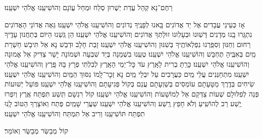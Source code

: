 \documentclass[twoside, openany, parskip=half, 11pt]{book}
\begin{document}
\shatzvkahal
רַחֶם־נָא קְהַל עֲדַת יְשֻׁרוּן סְלַח וּמְחַל עֲוֹנָם וְהוֹשִׁיעֵֽנוּ אֱלֹהֵי יִשְׁעֵֽנוּ׃

\begin{small}
אָז כְּעֵינֵי עֲבָדִים אֶל יַד אֲדוֹנִים בָּֽאנוּ לְפָנֶֽיךָ נְדוֹנִים וְהוֹשִׁיעֵֽנוּ אֱלֹהֵי יִשְׁעֵֽנוּ׃
גֵּאֶה אֲדוֹנֵי הָאֲדוֹנִים נִתְגָּֽרוּ בָֽנוּ מְדָנִים דָּשֽׁוּנוּ וּבְעָלֽוּנוּ זוּלָתְךָ אֲדוֹנִים וְהוֹשִׁיעֵֽנוּ אֱלֹהֵי יִשְׁעֵֽנוּ׃
הֵן גַּֽשְׁנוּ הַיּוֹם בְּתַחֲנוּן עָדֶֽיךָ רַחוּם וְחַנּוּן וְסִפַּֽרְנוּ נִפְלְאוֹתֶֽיךָ בְּשִׁנּוּן וְהוֹשִׁיעֵֽנוּ אֱלֹהֵי יִשְׁעֵֽנוּ׃
זָבַת חָלָב וּדְבַשׁ נָא אַל תִּיבָשׁ חַשְׁרַת מַֽיִם בְּאִבֶּֽיהָ תֶּחְבָּשׁ וְהוֹשִׁיעֵֽנוּ אֱלֹהֵי יִשְׁעֵֽנוּ׃
טְעֵֽנוּ בִשְׁמֵנָה בְּיַד שִׁבְעָה וּשְׁמוֹנָה יָשָׁר צַדִּיק אֵל אֱמוּנָה וְהוֹשִׁיעֵֽנוּ אֱלֹהֵי יִשְׁעֵֽנוּ׃
כָּרַֽתָּ בְרִית לָאָֽרֶץ עֹד כׇּל־יְמֵי הָאָֽרֶץ לְבִלְתִּי פְרָץ בָּהּ פָּֽרֶץ וְהוֹשִׁיעֵֽנוּ אֱלֹהֵי יִשְׁעֵֽנוּ׃
מִתְחַנְּנִים עֲלֵי מַֽיִם כַּעֲרָבִים עַל יִבְלֵי מַֽיִם נָא זְכׇר־לָֽמוֹ נִסּוּךְ הַמַּֽיִם וְהוֹשִׁיעֵֽנוּ אֱלֹהֵי יִשְׁעֵֽנוּ׃
שִׂיחִים בְּדֶֽרֶךְ מַטָּעָתָם עוֹמְסִים בְּשַׁוְעָתָם עֲנֵם בְּקוֹל פְּגִיעָתָם וְהוֹשִׁיעֵֽנוּ אֱלֹהֵי יִשְׁעֵֽנוּ׃
פּוֹעֵל יְשׁוּעוֹת פְּנֵה לְפִלּוּלָם שְׁעוֹת צַדְּקֵם אֵל לְמוֹשָׁעוֹת וְהוֹשִׁיעֵֽנוּ אֱלֹהֵי יִשְׁעֵֽנוּ׃
קוֹל רִגְשָׁם תִּֽשַׁע תִּפְתַּח אֶֽרֶץ וְיִפְרוּ יֶֽשַׁע רַב לְהוֹשִֽׁיעַ וְלֹא חָפֵץ רֶֽשַׁע וְהוֹשִׁיעֵֽנוּ אֱלֹהֵי יִשְׁעֵֽנוּ׃
שַׁעֲרֵי שָׁמַֽיִם פְּתַח וְאוֹצָרְךָ הַטּוֹב לָֽנוּ תִפְתַּח תּוֹשִׁיעֵֽנוּ וְרִיב אַל תִּמְתַּח וְהוֹשִׁיעֵֽנוּ אֱלֹהֵי יִשְׁעֵֽנוּ׃

\end{small}

\begin{large}
קוֹל מְבַשֵּׂר מְבַשֵּׂר וְאוֹמֵר׃

\end{large}
\end{document}
